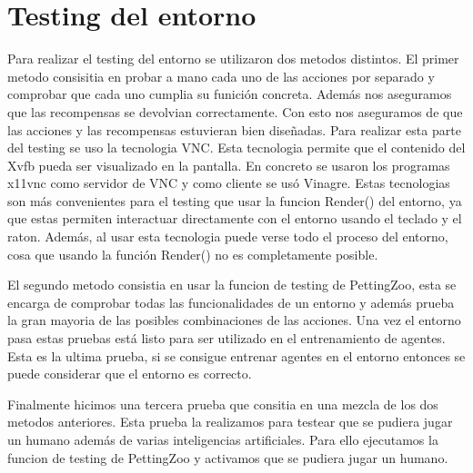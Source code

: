 \section{Testing del entorno}

Para realizar el testing del entorno se utilizaron dos metodos distintos. El primer metodo consisitia en probar a mano cada uno de las acciones por separado y comprobar que cada uno cumplia su funición concreta. Además nos aseguramos que las recompensas se devolvian correctamente. Con esto nos aseguramos de que las acciones y las recompensas estuvieran bien diseñadas. Para realizar esta parte del testing se uso la tecnologia VNC. Esta tecnologia permite que el contenido del Xvfb pueda ser visualizado en la pantalla. En concreto se usaron los programas x11vnc como servidor de VNC y como cliente se usó Vinagre. Estas tecnologias son más convenientes para el testing que usar la funcion Render() del entorno, ya que estas permiten interactuar directamente con el entorno usando el teclado y el raton. Además, al usar esta tecnologia puede verse todo el proceso del entorno, cosa que usando la función Render() no es completamente posible.

El segundo metodo consistia en usar la funcion de testing de PettingZoo, esta se encarga de comprobar todas las funcionalidades de un entorno y además prueba la gran mayoria de las posibles combinaciones de las acciones. Una vez el entorno pasa estas pruebas está listo para ser utilizado en el entrenamiento de agentes. Esta es la ultima prueba, si se consigue entrenar agentes en el entorno entonces se puede considerar que el entorno es correcto.

Finalmente hicimos una tercera prueba que consitia en una mezcla de los dos metodos anteriores. Esta prueba la realizamos para testear que se pudiera jugar un humano además de varias inteligencias artificiales. Para ello ejecutamos la funcion de testing de PettingZoo y activamos que se pudiera jugar un humano.
